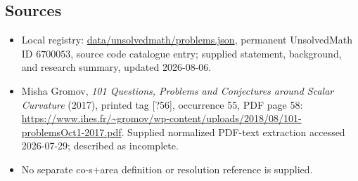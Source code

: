 \documentclass[11pt]{article}
\begin{document}
\subsection{Sources}
\begin{itemize}
\item Local registry: \url{data/unsolvedmath/problems.json}, permanent UnsolvedMath ID \(6700053\), source code catalogue entry; supplied statement, background, and research summary, updated 2026-08-06.
\item Misha Gromov, \emph{101 Questions, Problems and Conjectures around Scalar Curvature} (2017), printed tag [?56], occurrence 55, PDF page 58: \url{https://www.ihes.fr/~gromov/wp-content/uploads/2018/08/101-problemsOct1-2017.pdf}. Supplied normalized PDF-text extraction accessed 2026-07-29; described as incomplete.
\item No separate co-s+area definition or resolution reference is supplied.
\end{itemize}
\end{document}
